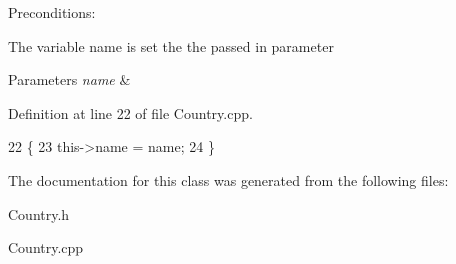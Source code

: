 Preconditions\+:
\begin{DoxyItemize}
\item The variable name is set the the passed in parameter 
\begin{DoxyParams}{Parameters}
{\em name} & \\
\hline
\end{DoxyParams}

\end{DoxyItemize}

Definition at line 22 of file Country.\+cpp.


\begin{DoxyCode}
22                                 \{
23     this->name = name;
24 \}
\end{DoxyCode}


The documentation for this class was generated from the following files\+:\begin{DoxyCompactItemize}
\item 
Country.\+h\item 
Country.\+cpp\end{DoxyCompactItemize}

